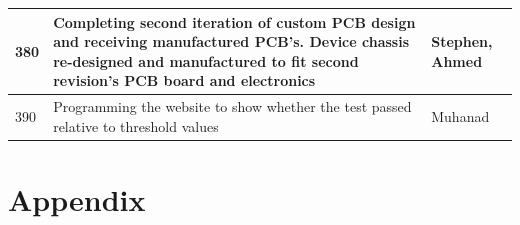 \documentclass[12pt]{article}
\begin{document}
\begin{table}[H]
\begin{tabular}{|p{2cm}|p{10cm}|p{2cm}|}
  380                          
  & Completing second iteration of custom PCB design and receiving manufactured PCB's. Device chassis re-designed and manufactured to fit second revision's PCB board and electronics
  & Stephen, Ahmed
  \newline                                
  \\ \hline

  390                                
  & Programming the website to show whether the test passed relative to threshold values
  & Muhanad 
  \newline    
  \\ \hline

  \end{tabular}
\end{table}

\newpage

\section{Appendix}
\end{document}
